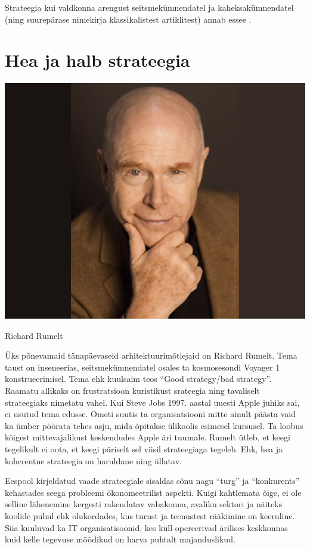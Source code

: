 \documentclass{tufte-book}
\begin{document}
Strateegia kui valdkonna arengust seitsmekümnendatel ja kaheksakümnendatel (ning suurepärase nimekirja klassikalistest artiklitest) annab \citeauthor{rumelt1991strategic} essee\cite{rumelt1991strategic} .

\section{Hea ja halb strateegia}
\label{sec:strategy:goodbad}

\begin{marginfigure}
	\begin{center}
		\includegraphics[trim={5cm 0 5cm 0},clip,width=.7\linewidth]{richard_rumelt.jpg}
		\caption{Richard Rumelt}
		\label{fig:rumelt}
	\end{center}
\end{marginfigure}

Üks põnevamaid tänapäevaseid arhitektuurimõtlejaid on Richard Rumelt. Tema taust on inseneerias, seitsmekümnendatel osales ta kosmosesondi Voyager 1 konstrueerimisel. Tema ehk kuulsaim teos \enquote{Good strategy/bad strategy}\cite{rumelt2011good}. Raamatu allikaks on frustratsioon kuristikust srateegia ning tavaliselt strateegiaks nimetatu vahel. Kui Steve Jobs 1997. aastal uuesti Apple juhiks sai, ei usutud tema edusse. Ometi suutis ta organisatsiooni mitte ainult päästa vaid ka ümber pöörata tehes asju, mida õpitakse ülikoolis esimesel kursusel. Ta loobus kõigest mittevajalikust keskendudes Apple äri tuumale. Rumelt ütleb, et keegi tegelikult ei oota, et keegi päriselt sel viisil strateegiaga tegeleb. Ehk, hea ja koherentne strateegia on haruldane ning üllatav.

Eespool kirjeldatud vaade strateegiale sisaldas sõnu nagu \enquote{turg} ja \enquote{konkurents} kehastades seega probleemi ökonomeetrilist aspekti. Kuigi kahtlemata õige, ei ole selline lähenemine kergesti rakendatav vabakonna, avaliku sektori ja näiteks koolide puhul ehk olukordades, kus turust ja teenustest rääkimine on keeruline. Siia kuuluvad ka IT organisatisoonid, kes küll opereerivad ärilises keskkonnas kuid kelle tegevuse mõõdikud on harva puhtalt majanduslikud.
\end{document}
